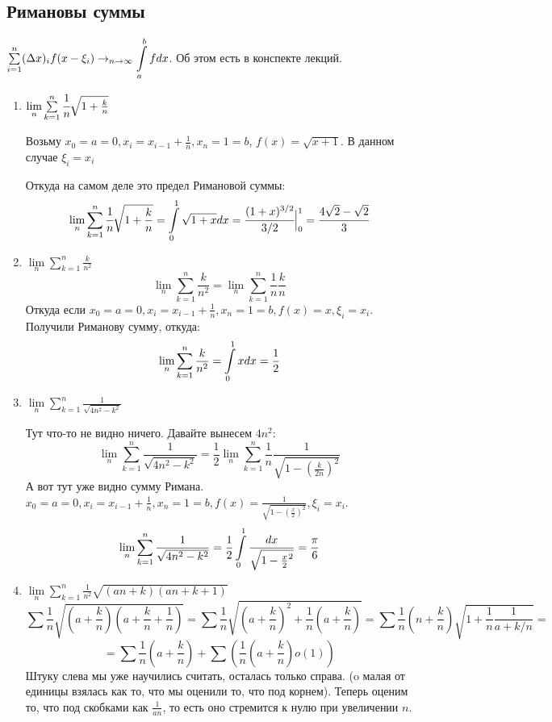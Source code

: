 \subsection{Римановы суммы}

$\sum\limits_{i=1}^n (\Delta x)_i f(x-\xi_i) \rightarrow_{n \rightarrow \infty} \displaystyle\int\limits_{a}^{b}fdx$. Об этом есть в конспекте лекций.

\begin{enumerate}
    \item $\lim\limits_n \sum\limits_{k=1}^n \cfrac{1}{n}\sqrt{1+ \frac{k}{n}}$

    Возьму $x_0 =  a  = 0, x_i = x_{i-1} + \frac{1}{n}, x_n  = 1=b$, $f(x) = \sqrt{x+1}$. В данном случае $\xi_i = x_i$
    
    Откуда на самом деле это предел Римановой суммы:
    $$ \lim\limits_n \sum\limits_{k=1}^n \cfrac{1}{n}\sqrt{1+ \frac{k}{n}}= \displaystyle\int\limits_{0}^{1}\sqrt{1+x}dx = \cfrac{(1+x)^{3/2}}{3/2}\Big|^1_0 =\cfrac{4\sqrt{2}-\sqrt{2}}{3}$$
    \item $\lim\limits_n \sum\limits_{k=1}^n \frac{k}{n^2}$
    $$\lim\limits_n \sum\limits_{k=1}^n \frac{k}{n^2} = \lim\limits_n \sum\limits_{k=1}^n \frac{1}{n}\frac{k}{n}$$
    Откуда если $x_0 = a = 0,x_i = x_{i-1}+\frac{1}{n}, x_n = 1 =b, f(x)=x,\xi_{i} = x_i$. Получили Риманову сумму, откуда:
    $$\lim\limits_n \sum\limits_{k=1}^n \frac{k}{n^2} = \displaystyle\int\limits_{0}^{1}xdx = \frac{1}{2}$$
    
    \item $\lim\limits_n \sum\limits_{k=1}^n \frac{1}{\sqrt{4n^2-k^2}}$

    Тут что-то не видно ничего. Давайте вынесем $4n^2:$
    $$\lim\limits_n \sum\limits_{k=1}^n \frac{1}{\sqrt{4n^2-k^2}} = \frac{1}{2}\lim\limits_n \sum\limits_{k=1}^n \frac{1}{n}\frac{1}{\sqrt{1-(\frac{k}{2n})^2}}$$
    А вот тут уже видно сумму Римана. $x_0 = a = 0,x_i = x_{i-1}+\frac{1}{n}, x_n = 1 =b, f(x)= \frac{1}{\sqrt{1-(\frac{x}{2})^2}}, \xi_i =x_i$. 
    $$\lim\limits_n \sum\limits_{k=1}^n \frac{1}{\sqrt{4n^2-k^2}}=\frac{1}{2} \displaystyle\int\limits_{0}^{1}\frac{dx}{\sqrt{1-\frac{x}{2}^2}} = \frac{\pi}{6}$$
    \item $\lim\limits_{n}\sum\limits_{k=1}^n \frac{1}{n^2}\sqrt{(an+k)(an+k+1)}$
    $$\sum \frac{1}{n}\sqrt{(a+\frac{k}{n})(a+\frac{k}{n}+\frac{1}{n})} = \sum\limits\frac{1}{n}\sqrt{(a+\frac{k}{n})^2 + \frac{1}{n}(a+\frac{k}{n})}= \sum \frac{1}{n}(n+\frac{k}{n})\sqrt{1 + \frac{1}{n} \frac{1}{a+k/n}} = $$
    $$=\sum \frac{1}{n}(a+\frac{k}{n})+\sum (\frac{1}{n}(a+\frac{k}{n})o(1))$$
    Штуку слева мы уже научились считать, осталась только справа. 
    (o малая от единицы взялась как то, что мы оценили  то, что под корнем).
    Теперь оценим то, что под скобками как $\frac{1}{an}$, то есть оно стремится к нулю при увеличении $n$. 


\end{enumerate}
